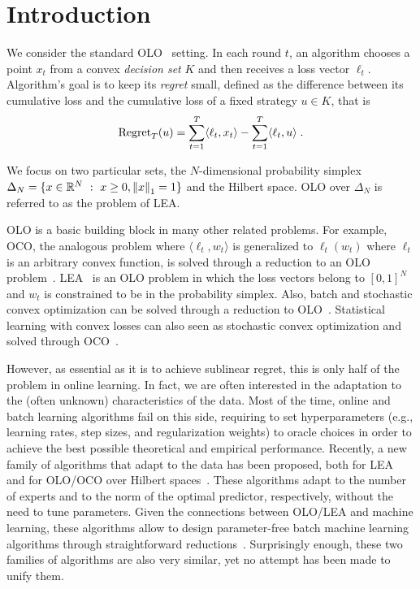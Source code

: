 \section{Introduction}
\label{section:introduction}

We consider the standard \ac{OLO}~\citep{Cesa-Bianchi-Lugosi-2006,
Shalev-Shwartz-2011} setting. In each round $t$, an algorithm chooses a point $x_t$ from a convex \emph{decision set}
$K$ and then receives a loss vector $\ell_t$. Algorithm's goal is to keep its
\emph{regret} small, defined as the difference between its cumulative loss and the cumulative loss of a fixed strategy $u \in K$, that is
$$
\operatorname{Regret}_T(u) = \sum_{t=1}^T \langle \ell_t, x_t \rangle - \sum_{t=1}^T \langle \ell_t, u \rangle \; .
$$

We focus on two particular sets, the $N$-dimensional probability simplex
$\Delta_N = \{ x \in \mathbb{R}^N ~:~ x \ge 0, \left\|{x}\right\|_1 = 1\}$ and the Hilbert space.
\ac{OLO} over $\Delta_N$ is referred to as the problem of \ac{LEA}.

\ac{OLO} is a basic building block in many other related problems. For example,
\ac{OCO}, the analogous problem where $\langle \ell_t, w_t \rangle$ is
generalized to $\ell_t(w_t)$ where $\ell_t$ is an arbitrary convex function, is
solved through a reduction to an \ac{OLO} problem~\citep{Shalev-Shwartz-2011}.
\ac{LEA}~\citep{Littlestone-Warmuth-1994, Vovk-1998,
Cesa-Bianchi-Freund-Haussler-Helmbold-Schapire-Warmuth-1997} is an \ac{OLO}
problem in which the loss vectors belong to $[0,1]^N$ and $w_t$ is constrained
to be in the probability simplex. Also, batch and stochastic convex
optimization can be solved through a reduction to
\ac{OLO}~\citep{Shalev-Shwartz-2011}. Statistical learning with convex losses
can also seen as stochastic convex optimization and solved through
\ac{OCO}~\citep{Munro-1951}.

However, as essential as it is to achieve sublinear regret, this is only half
of the problem in online learning. In fact, we are often interested in the
adaptation to the (often unknown) characteristics of the data. Most of the
time, online and batch learning algorithms fail on this side, requiring to set
hyperparameters (e.g., learning rates, step sizes, and regularization weights)
to oracle choices in order to achieve the best possible theoretical and
empirical performance. Recently, a new family of algorithms that adapt to the
data has been proposed, both for \ac{LEA}~\citep{Chaudhuri-Freund-Hsu-2009,
Chernov-Vovk-2010, Luo-Schapire-2014, Luo-Schapire-2015, Koolen-van-Erven-2015}
and for \ac{OLO}/\ac{OCO} over Hilbert spaces~\citep{Streeter-McMahan-2012,
Orabona-2013, McMahan-Abernethy-2013, McMahan-Orabona-2014, Orabona-2014}.
These algorithms adapt to the number of experts and to the norm of the optimal
predictor, respectively, without the need to tune parameters. Given the
connections between \ac{OLO}/\ac{LEA} and machine learning, these algorithms
allow to design parameter-free batch machine learning algorithms through
straightforward reductions~\citep{Orabona-2014,Luo-Schapire-2015}.  Surprisingly enough,
these two families of algorithms are also very similar, yet no attempt has been
made to unify them.

